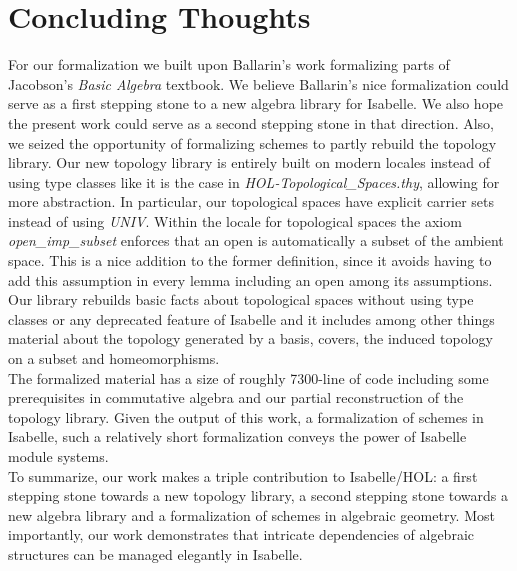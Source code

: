 \documentclass[12pt]{scrartcl}
\begin{document}


\section{Concluding Thoughts}

For our formalization we built upon Ballarin's work \cite{ballarin20} formalizing parts of Jacobson's \textit{Basic Algebra} textbook. We believe Ballarin's nice formalization could serve as a first stepping stone to a new algebra library for Isabelle. We also hope the present work could serve as a second stepping stone in that direction. Also, we seized the opportunity of formalizing schemes to partly rebuild the topology library. Our new topology library is entirely built on modern locales instead of using type classes like it is the case in \textit{HOL-Topological\_Spaces.thy}, allowing for more abstraction. In particular, our topological spaces have explicit carrier sets instead of using \textit{UNIV}. 
Within the locale for topological spaces the axiom \textit{open\_imp\_subset} enforces that an open is automatically a subset of the ambient space. This is a nice addition to the former definition, since it avoids having to add this assumption in every lemma including an open among its assumptions. Our library rebuilds basic facts about topological spaces without using type classes or any deprecated feature of Isabelle and it includes among other things material about the topology generated by a basis, covers, the induced topology on a subset and homeomorphisms. 
\\
The formalized material has a size of roughly 7300-line of code including some prerequisites in commutative  algebra and our partial reconstruction of the topology library. Given the output of this work, a formalization of schemes in Isabelle, such a relatively short formalization conveys the power of Isabelle module systems. \\
To summarize, our work makes a triple contribution to Isabelle/HOL: a first stepping stone towards a new topology library, a second stepping stone towards a new algebra library and a formalization of schemes in algebraic geometry. Most importantly, our work demonstrates that intricate dependencies of algebraic structures can be managed elegantly in Isabelle. 
\end{document}
